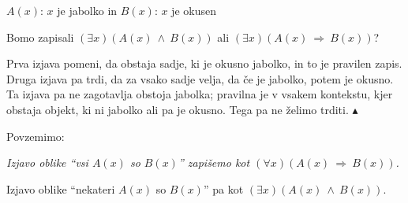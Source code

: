 \documentclass[12pt,a4paper]{article}
\def\inn {{~\wedge~}}
\def\sledi {{~\Rightarrow~}}
\def\kz{{\hfill{\color{blue}$\blacktriangle$}}}%
\begin{document}
$A(x)$: $x$ je jabolko
 in
$B(x)$: $x$ je okusen

Bomo zapisali $(\exists x)(A(x)\inn B(x))$ ali $(\exists x)(A(x) \sledi B(x))$?

Prva izjava pomeni, da obstaja sadje, ki je okusno jabolko, in to je pravilen zapis.
Druga izjava pa trdi, da za vsako sadje velja, da če je jabolko, potem je okusno. Ta izjava pa ne zagotavlja obstoja jabolka;
pravilna je v vsakem kontekstu, kjer obstaja objekt, ki ni jabolko ali pa je okusno. Tega pa ne želimo trditi.
\kz

\medskip
Povzemimo:

{\it Izjavo oblike ``vsi $A(x)$ so $B(x)$'' zapišemo kot $(\forall x)(A(x)\sledi B(x))$.

Izjavo oblike ``nekateri $A(x)$ so $B(x)$'' pa kot $(\exists x)(A(x)\inn B(x))$.}

\medskip

\medskip
{}

\iftoggle{long}{
{\color{blue}Naj bo domena pogovora množica naravnih števil. Tedaj so naslednje izjave s kvantifikatorji smiselne:}
\begin{itemize}
  \item $(\forall$ $n)$ ($n$ je deljiv z 2).
  \item
$(\exists n)$ ($n$ je deljiv z 2).
  \item
$(\exists !n)$ ($n$ je najmanjše naravno število).
\end{itemize}

Kako bi zapisali zgornje izjave, če bi bila domena pogovora množica realnih števil z uporabo predikata
$N(n):$ ``$n$ je naravno število''?
\begin{itemize}
  \item $(\forall$ $n)$ ($N(n)\sledi n$ je deljiv z 2).
  \item
$(\exists n)$ ($N(n)\inn n$ je deljiv z 2).
  \item
$(\exists !n)$ ($N(n)\inn n$ je najmanjše naravno število).
\end{itemize}

\medskip
}
{Naj bo domena pogovora množica naravnih števil. Tedaj so naslednje izjave s kvantifikatorji smiselne:
\begin{itemize}
  \item $(\forall$ $n)$ ($n$ je deljiv z 2).
  \item
$(\exists n)$ ($n$ je deljiv z 2).
  \item
$(\exists !n)$ ($n$ je najmanjše naravno število).
\end{itemize}
Kako bi zapisali zgornje izjave, če bi bila domena pogovora množica realnih števil z uporabo predikata
$N(n):$ ``$n$ je naravno število''?
\begin{itemize}
  \item $(\forall$ $n)$ ($N(n)\sledi n$ je deljiv z 2).
  \item
$(\exists n)$ ($N(n)\inn n$ je deljiv z 2).
  \item
$(\exists !n)$ ($N(n)\inn n$ je najmanjše naravno število).
\end{itemize}
}
\end{document}
